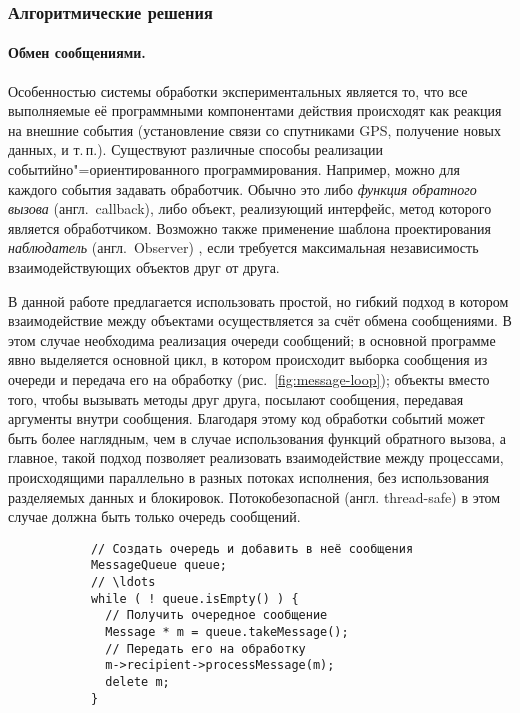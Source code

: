\documentclass[a4paper, 14pt, titlepage]{extarticle}
\newcommand{\eng}[1]{\foreignlanguage{english}{#1}}
\newcommand{\term}[1]{\emph{#1}}
\newenvironment{myfigure}[2]%
    {\pushQED{\caption{#1} \label{#2}} %
     \begin{figure}[!htb]\centering } %
    {  \popQED %
     \end{figure}}
\begin{document}
  \subsubsection{Алгоритмические решения}
  \paragraph{Обмен сообщениями.}
  Особенностью системы обработки экспериментальных является то, что все выполняемые её программными
  компонентами действия происходят как реакция на внешние события (установление связи со
  спутниками GPS, получение новых данных, и т.\,п.). Существуют различные способы реализации
  событийно"=ориентированного программирования. Например, можно для каждого события задавать
  обработчик. Обычно это либо \term{функция обратного вызова} (англ.~\eng{callback}), либо объект,
  реализующий интерфейс, метод которого является обработчиком. Возможно также применение шаблона
  проектирования \term{наблюдатель} (англ.~\eng{Observer}) \cite{gamma-patterns}, если требуется
  максимальная независимость взаимодействующих объектов друг от друга.

  В данной работе предлагается использовать простой, но гибкий подход в котором взаимодействие между
  объектами осуществляется за счёт обмена сообщениями. В этом случае необходима реализация очереди
  сообщений; в основной программе явно выделяется основной цикл, в котором происходит выборка
  сообщения из очереди и передача его на обработку (рис.~\ref{fig:message-loop}); объекты вместо
  того, чтобы вызывать методы друг друга, посылают сообщения, передавая аргументы внутри сообщения.
  Благодаря этому код обработки событий может быть более наглядным, чем в случае использования
  функций обратного вызова, а главное, такой подход позволяет реализовать взаимодействие между
  процессами, происходящими параллельно в разных потоках исполнения, без использования разделяемых
  данных и блокировок. Потокобезопасной (англ. \eng{thread-safe}) в этом случае должна быть только
  очередь сообщений.

  \begin{myfigure}{Примерный вид основного цикла}{fig:message-loop}
    \begin{lstlisting}
      // Создать очередь и добавить в неё сообщения
      MessageQueue queue;
      // \ldots
      while ( ! queue.isEmpty() ) {
        // Получить очередное сообщение
        Message * m = queue.takeMessage();
        // Передать его на обработку
        m->recipient->processMessage(m);
        delete m;
      }
    \end{lstlisting}
  \end{myfigure}
\end{document}
